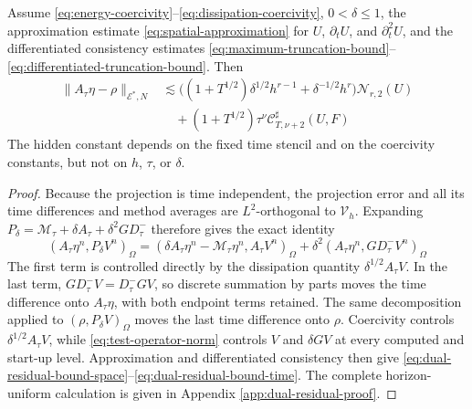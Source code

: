 \documentclass[11pt]{article}
\begin{document}
\begin{prop}
\label{prop:dual-residual-bound}
Assume \eqref{eq:energy-coercivity}--\eqref{eq:dissipation-coercivity},
\(0<\delta\le1\), the approximation estimate
\eqref{eq:spatial-approximation} for \(U\), \(\partial_tU\), and
\(\partial_t^2U\), and the differentiated consistency estimates
\eqref{eq:maximum-truncation-bound}--\eqref{eq:differentiated-truncation-bound}.
Then
\begin{align}
\|A_{\tau}\eta-\rho\|_{\mathcal E^*,N}
&\lesssim
\bigl((1+T^{1/2})\delta^{1/2}h^{r-1}
+\delta^{-1/2}h^r\bigr)\mathcal N_{r,2}(U)
\label{eq:dual-residual-bound-space}\\
&\quad+(1+T^{1/2})\tau^\nu
\mathcal C^{\sharp}_{T,\nu+2}(U,F)
\label{eq:dual-residual-bound-time}
\end{align}
The hidden constant depends on the fixed time stencil and on the coercivity
constants, but not on \(h\), \(\tau\), or \(\delta\).
\end{prop}
\begin{proof}
Because the projection is time independent, the projection error and all its
time differences and method averages are \(L^2\)-orthogonal to
\(\mathcal V_h\). Expanding
\(P_{\delta}=\mathcal M_{\tau}+\delta A_{\tau}
+\delta^2GD_{\tau}^{-}\) therefore gives the exact identity
\begin{equation}
(A_{\tau}\eta^n,P_{\delta}V^n)_{\Omega}
=(\delta A_{\tau}\eta^n-\mathcal M_{\tau}\eta^n,
A_{\tau}V^n)_{\Omega}
+\delta^2(A_{\tau}\eta^n,GD_{\tau}^{-}V^n)_{\Omega}
\label{eq:dual-projection-functional-identity}
\end{equation}
The first term is controlled directly by the dissipation quantity
\(\delta^{1/2}A_{\tau}V\). In the last term,
\(GD_{\tau}^{-}V=D_{\tau}^{-}GV\), so discrete summation by parts moves the
time difference onto \(A_{\tau}\eta\), with both endpoint terms retained.
The same decomposition applied to \((\rho,P_{\delta}V)_{\Omega}\) moves the
last time difference onto \(\rho\). Coercivity controls
\(\delta^{1/2}A_{\tau}V\), while
\eqref{eq:test-operator-norm} controls \(V\) and \(\delta GV\) at every
computed and start-up level. Approximation and differentiated consistency then
give \eqref{eq:dual-residual-bound-space}--\eqref{eq:dual-residual-bound-time}.
The complete horizon-uniform calculation is given in Appendix
\ref{app:dual-residual-proof}.
\end{proof}
\end{document}
